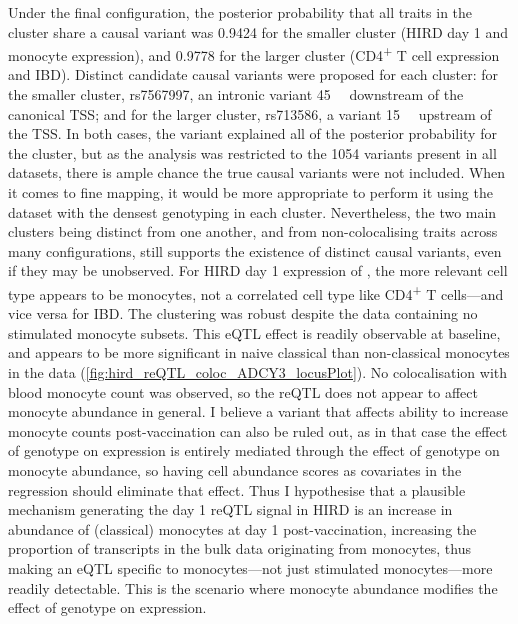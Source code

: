 Under the final configuration, the posterior probability that all traits in the cluster share a causal variant was 
\num{0.9424} for the smaller cluster (\gls{HIRD} day 1 and monocyte expression),
and \num{0.9778} for the larger cluster (CD4\textsuperscript{+} T cell expression and \gls{IBD}).
Distinct candidate causal variants were proposed for each cluster:
for the smaller cluster, rs7567997, an intronic variant \SI{45}{\kilo\bp} downstream of the canonical  \gls{TSS};
and for the larger cluster, rs713586, a variant \SI{15}{\kilo\bp} upstream of the \gls{TSS}.
In both cases, the variant explained all of the posterior probability for the cluster, 
but as the analysis was restricted to the 1054 variants present in all datasets, there is ample chance the true causal variants were not included.
When it comes to fine mapping, it would be more appropriate to perform it using the dataset with the densest genotyping in each cluster.
%
Nevertheless, the two main clusters being distinct from one another, and from non-colocalising traits across many configurations,
still supports the existence of distinct causal variants, even if they may be unobserved.
For \gls{HIRD} day 1 expression of , the more relevant cell type appears to be monocytes, not a correlated cell type like CD4\textsuperscript{+} T cells---and vice versa for \gls{IBD}.
The clustering was robust despite the data containing no stimulated monocyte subsets.
This \gls{eQTL} effect is readily observable at baseline, and appears to be more significant in naive classical than non-classical monocytes in the \textcite{schmiedel2018ImpactGeneticPolymorphisms} data (\cref{fig:hird_reQTL_coloc_ADCY3_locusPlot}).
No colocalisation with blood monocyte count was observed, 
so the \gls{reQTL} does not appear to affect monocyte abundance in general.
I believe a variant that affects ability to increase monocyte counts post-vaccination can also be ruled out,
as in that case the effect of genotype on expression is entirely mediated through the effect of genotype on monocyte abundance,
so having cell abundance scores as covariates in the regression should eliminate that effect.
Thus I hypothesise that a plausible mechanism generating the day 1 \gls{reQTL} signal in \gls{HIRD}
is an increase in abundance of (classical) monocytes at day 1 post-vaccination,
increasing the proportion of  transcripts in the bulk data originating from monocytes,
thus making an \gls{eQTL} specific to monocytes---not just stimulated monocytes---more readily detectable.
This is the scenario where monocyte abundance modifies the effect of genotype on expression.

